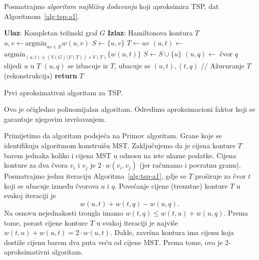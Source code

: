 \documentclass[b5paper, utf8, 11pt, colorlinks]{book}
\theoremstyle{definition}
\begin{document}
Posmatrajmo \emph{algoritam najbližeg dodavanja} koji aproksimira TSP, dat Algoritmom~\ref{alg:tsp-a1}. 
  
   \begin{algorithm}[!hbt] 
  
  	\begin{algorithmic}[1]
  		\STATE \textbf{Ulaz}: Kompletan težinski graf $G$
  		\STATE \textbf{Izlaz}: Hamiltonova kontura $T$  
  		\STATE $u,v \gets \mbox{argmin}_{uv \in E} w(u,v)$
  		\STATE $S \gets \{u,v\}$
  		\STATE $T \gets uv$
  		\STATE $(u,t) \gets$ $\mbox{argmin}_{(u,t) \in (V(G)\setminus V(T)) \times V(T)} \{w(u, t)\}$
  		\STATE $ S \gets S \cup \{u\}$ 
  		\STATE $(u, q)\gets$ čvor $q$ slijedi $u$ u  $T$
  		\STATE  $(u,q)$ se izbacuje iz $T$, ubacuje se $(u,t), (t,q)$  // Ažururanje $T$ (rekonstrukcija)
  		\ENDWHILE
  		\STATE \textbf{return} $T$
  	\end{algorithmic}
   	\caption{Prvi aproksimativni algoritam za TSP.}
   	\label{alg:tsp-a1}
  \end{algorithm}

 Ovo je očigledno polinomijalan algoritam. Odredimo aproksimacioni faktor koji se garantuje 
njegovim izvršavanjem. 

Primijetimo da algoritam podsjeća na Primov algoritam. Grane koje se identifikuju algoritmom 
konstruišu MST. Zaključujemo da je cijena konture $T$ barem jednaka koliko i cijena MST u odnosu na iste ulazne podatke. Cijena konture za dva čvora $v_i$ i $v_j$ je $2 \cdot w({v_i,v_j})$ (jer računamo i povratnu granu). Posmatrajmo jednu iteraciju Algoritma~\ref{alg:tsp-a1}, gdje se $T$
proširuje za čvor $t$ koji se ubacuje između čvorova  $u$ i $q$. Povećanje cijene (trenutne) konture $T$ u svakoj iteraciji je $$w({u,t}) + w({t,q})-w({u,q}).$$
Na osnovu nejednakosti trougla imamo $ w({t,q}) \leq w({t,u}) + w({u,q})$. Prema tome, porast cijene konture $T$ u svakoj iteraciji je najviše $ w({t, u}) + w({u,t}) = 2\cdot w({u,t})$. 
Dakle, završna kontura ima cijenu koja dostiže cijenu barem dva puta veću od cijene MST. Prema tome, ovo je 2-aproksimativni algoritam. 
\end{document}
